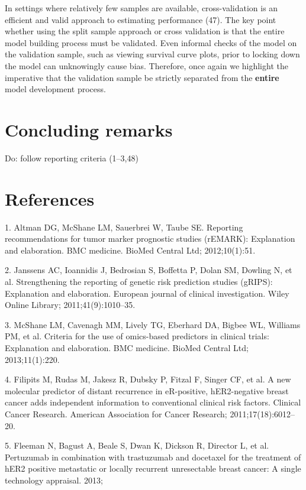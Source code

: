 \documentclass[11pt]{article}
\begin{document}
In settings where relatively few samples are available, cross-validation
is an efficient and valid approach to estimating performance (47). The
key point whether using the split sample approach or cross validation is
that the entire model building process must be validated. Even informal
checks of the model on the validation sample, such as viewing survival
curve plots, prior to locking down the model can unknowingly cause bias.
Therefore, once again we highlight the imperative that the validation
sample be strictly separated from the \textbf{entire} model development
process.

\section{Concluding remarks}\label{concluding-remarks}

Do: follow reporting criteria (1--3,48)

\section{References}\label{references}

\setlength{\parindent}{0pt}

1. Altman DG, McShane LM, Sauerbrei W, Taube SE. Reporting
recommendations for tumor marker prognostic studies (rEMARK):
Explanation and elaboration. BMC medicine. BioMed Central Ltd;
2012;10(1):51.

2. Janssens AC, Ioannidis J, Bedrosian S, Boffetta P, Dolan SM, Dowling
N, et al. Strengthening the reporting of genetic risk prediction studies
(gRIPS): Explanation and elaboration. European journal of clinical
investigation. Wiley Online Library; 2011;41(9):1010--35.

3. McShane LM, Cavenagh MM, Lively TG, Eberhard DA, Bigbee WL, Williams
PM, et al. Criteria for the use of omics-based predictors in clinical
trials: Explanation and elaboration. BMC medicine. BioMed Central Ltd;
2013;11(1):220.

4. Filipits M, Rudas M, Jakesz R, Dubsky P, Fitzal F, Singer CF, et al.
A new molecular predictor of distant recurrence in eR-positive,
hER2-negative breast cancer adds independent information to conventional
clinical risk factors. Clinical Cancer Research. American Association
for Cancer Research; 2011;17(18):6012--20.

5. Fleeman N, Bagust A, Beale S, Dwan K, Dickson R, Director L, et al.
Pertuzumab in combination with trastuzumab and docetaxel for the
treatment of hER2 positive metastatic or locally recurrent unresectable
breast cancer: A single technology appraisal. 2013;
\end{document}
